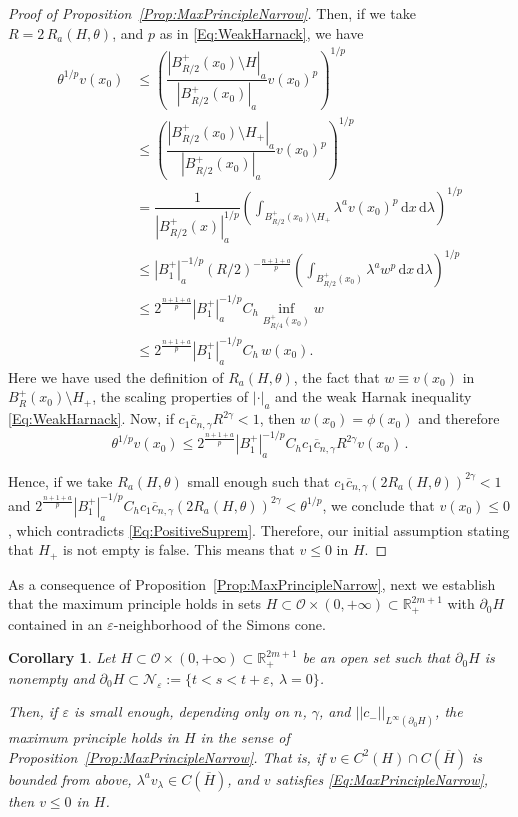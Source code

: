 \documentclass[12pt,reqno]{amsart}
\newtheorem{corollary}[theorem]{Corollary}
\theoremstyle{definition}
\theoremstyle{remark}
\newcommand{\con}[1]{\mathbb{#1}}
\newcommand{\R}{\con{R}} %
\newcommand{\ncal}{\mathcal{N}}
\newcommand{\ocal}{\mathcal{O}}
\newcommand{\norm}[1]{\left | \left |{#1} \right | \right |}
\newcommand{\s}{\gamma}
\renewcommand{\d}{\,\mathrm{d}} %
\numberwithin{equation}{section}
\begin{document}
\begin{proof}[Proof of Proposition~\ref{Prop:MaxPrincipleNarrow}]
Then, if we take $R = 2\,R_a( H,\theta)$, and $p$ as in \eqref{Eq:WeakHarnack}, we have
\begin{align*}
\theta^{1/p} v(x_0) & \leq \left (  \dfrac{|B^+_{R/2}(x_0)\setminus   H|_a}{|B^+_{R/2}(x_0)|_a}  v(x_0)^p \right)^{1/p} \\
& \leq \left (  \dfrac{|B^+_{R/2}(x_0)\setminus  H_+|_a}{|B^+_{R/2}(x_0)|_a}  v(x_0)^p \right)^{1/p} \\
&= \dfrac{1}{|B^+_{R/2}(x)|_a^{1/p}}  \left (  \int_{B^+_{R/2}(x_0)\setminus  H_+} \lambda ^a v(x_0)^p \d x \d \lambda  \right)^{1/p} \\
&\leq |B_1^+|_a^{-1/p} (R/2)^{- \frac{n+1+a}{p}} \left (  \int_{B^+_{R/2}(x_0)} \lambda ^a w^p \d x \d \lambda  \right)^{1/p} \\
&\leq 2^{\frac{n+1+a}{p}}|B_1^+|_a^{-1/p} C_h \inf_{B^+_{R/4}(x_0)} w \\
& \leq 2^{\frac{n+1+a}{p}}|B_1^+|_a^{-1/p} C_h \,  w(x_0).
\end{align*}
Here we have used the definition of $R_a( H,\theta)$, the fact that $w \equiv v(x_0)$ in $B^+_R(x_0)\setminus H_+$, the scaling properties of $|\cdot |_a$ and the weak Harnak inequality \eqref{Eq:WeakHarnack}. Now, if $c_1 \overline{c}_{n,\s} R^{2\s} < 1$, then $w(x_0) = \phi(x_0)$ and therefore
$$
\theta^{1/p} v(x_0) \leq  2^{\frac{n+1+a}{p}}|B_1^+|_a^{-1/p} C_h c_1 \overline{c}_{n,\s} R^{2\s} v(x_0)\,.
$$

Hence, if we take $R_a( H,\theta)$ small enough such that $c_1 \overline{c}_{n,\s} (2 R_a( H,\theta))^{2\s} < 1$ and $ 2^{\frac{n+1+a}{p}} |B_1^+|_a^{-1/p} C_h c_1 \overline{c}_{n,\s} (2 R_a( H,\theta))^{2\s} < \theta^{1/p}$, we conclude that $v(x_0) \leq 0$, which contradicts \eqref{Eq:PositiveSuprem}. Therefore, our initial assumption stating that $ H_+$ is not empty is false. This means that $v\leq 0$ in $H$.
\end{proof}

As a consequence of Proposition~\ref{Prop:MaxPrincipleNarrow}, next we establish that the maximum principle holds in sets $ H \subset \ocal \times (0, +\infty) \subset \R^{2m+1}_+$ with $\partial_0  H$ contained in an $\varepsilon$-neighborhood of the Simons cone.

\begin{corollary}
\label{Cor:MaxPrincipleNarrowSaddle}
Let $H\subset \ocal \times (0, +\infty) \subset \R^{2m + 1}_+$ be an open set such that $\partial_0 H$ is nonempty and $\partial_0 H \subset \ncal_\varepsilon := \{t < s < t+\varepsilon, \ \lambda= 0 \}$. 

Then, if $\varepsilon$ is small enough, depending only on $n$, $\s$, and $\norm{c_-}_{L^\infty(\partial_0 H)}$, the maximum principle holds in $H$ in the sense of Proposition~\ref{Prop:MaxPrincipleNarrow}. That is, if $v \in C^2 (H)\cap C(\overline{H})$ is bounded from above, $\lambda^a v_\lambda \in C (\overline{H})$, and $v$ satisfies \eqref{Eq:MaxPrincipleNarrow}, then $v\leq 0$ in $H$.
\end{corollary}
\end{document}
